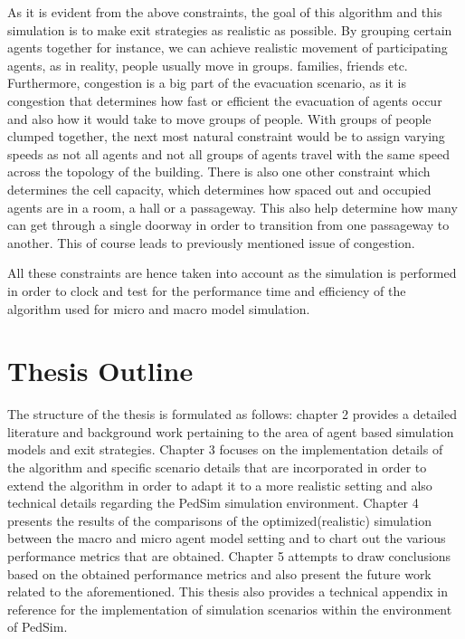 As it is evident from the above constraints, the goal of this algorithm and this simulation is to make exit strategies as realistic as possible. By grouping certain agents together for instance, we can achieve realistic movement of participating agents, as in reality, people usually move in groups. families, friends etc. Furthermore, congestion is a big part of the evacuation scenario, as it is congestion that determines how fast or efficient the evacuation of agents occur and also how it would take to move groups of people. With groups of people clumped together, the next most natural constraint would be to assign varying speeds as not all agents and not all groups of agents travel with the same speed across the topology of the building. There is also one other constraint which determines the cell capacity, which determines how spaced out and occupied agents are in a room, a hall or a passageway. This also help determine how many can get through a single doorway in order to transition from one passageway to another. This of course leads to previously mentioned issue of congestion. 

All these constraints are hence taken into account as the simulation is performed in order to clock and test for the performance time and efficiency of the algorithm used for micro and macro model simulation.

\section{Thesis Outline}
\label{sec:intro:Thesis Outline}

The structure of the thesis is formulated as follows: chapter 2 provides a detailed literature and background work pertaining to the area of agent based simulation models and exit strategies. Chapter 3 focuses on the implementation details of the algorithm and specific scenario details that are incorporated in order to extend the algorithm in order to adapt it to a more realistic setting and also technical details regarding the PedSim simulation environment. Chapter 4 presents the results of the comparisons of the optimized(realistic) simulation between the macro and micro agent model setting and to chart out the various performance metrics that are obtained. Chapter 5 attempts to draw conclusions based on the obtained performance metrics and also present the future work related to the aforementioned. This thesis also provides a technical appendix in reference for the implementation of simulation scenarios within the environment of PedSim.
